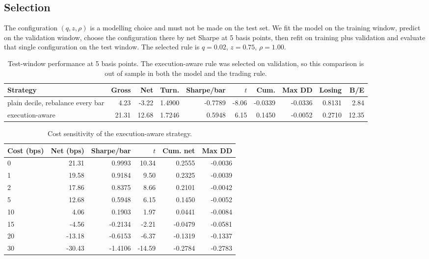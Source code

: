 \documentclass[11pt]{article}
\begin{document}
\subsection{Selection}

The configuration $(q, z, \rho)$ is a modelling choice and must not be made on
the test set. We fit the model on the training window, predict on the
validation window, choose the configuration there by net Sharpe at 5 basis
points, then refit on training plus validation and evaluate that single
configuration on the test window. The selected rule is
$q = 0.02$, $z = 0.75$, $\rho = 1.00$.

\begin{table}[!htbp]
\centering
\small
\caption{Test-window performance at 5 basis points. The execution-aware rule
was selected on validation, so this comparison is out of sample in both the
model and the trading rule.}
\label{tab:execution}
\begin{tabular}{lrrrrrrrrr}
\toprule
Strategy & Gross & Net & Turn. & Sharpe/bar & $t$ & Cum. & Max DD & Losing & B/E \\
\midrule
plain decile, rebalance every bar & 4.23 & -3.22 & 1.4900 & -0.7789 & -8.06 & -0.0339 & -0.0336 & 0.8131 & 2.84 \\
execution-aware & 21.31 & 12.68 & 1.7246 & 0.5948 & 6.15 & 0.1450 & -0.0052 & 0.2710 & 12.35 \\
\bottomrule
\end{tabular}
\end{table}

\begin{table}[!htbp]
\centering
\small
\caption{Cost sensitivity of the execution-aware strategy.}
\label{tab:execcost}
\begin{tabular}{lrrrrr}
\toprule
Cost (bps) & Net (bps) & Sharpe/bar & $t$ & Cum. net & Max DD \\
\midrule
0 & 21.31 & 0.9993 & 10.34 & 0.2555 & -0.0036 \\
1 & 19.58 & 0.9184 & 9.50 & 0.2325 & -0.0039 \\
2 & 17.86 & 0.8375 & 8.66 & 0.2101 & -0.0042 \\
5 & 12.68 & 0.5948 & 6.15 & 0.1450 & -0.0052 \\
10 & 4.06 & 0.1903 & 1.97 & 0.0441 & -0.0084 \\
15 & -4.56 & -0.2134 & -2.21 & -0.0479 & -0.0581 \\
20 & -13.18 & -0.6153 & -6.37 & -0.1319 & -0.1337 \\
30 & -30.43 & -1.4106 & -14.59 & -0.2784 & -0.2783 \\
\bottomrule
\end{tabular}
\end{table}
\end{document}
